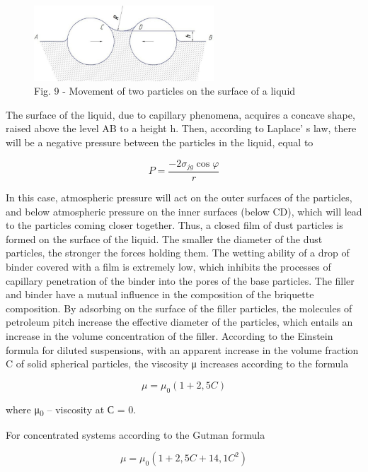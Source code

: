 \begin{figure}[H]
	\centering
	\includegraphics[width=0.6\textwidth]{media/gorn2/image12}
	\caption*{Fig. 9 - Movement of two particles on the surface of a liquid}
\end{figure}

\begin{multicols}{2}
The surface of the liquid, due to capillary phenomena, acquires a
concave shape, raised above the level AB to a height h. Then, according
to Laplace' s law, there will be a negative pressure
between the particles in the liquid, equal to

\begin{equation*}
    P = \frac{-2\sigma_{jg} \cos\varphi}{r}
\end{equation*}

In this case, atmospheric pressure will act on the outer surfaces of the
particles, and below atmospheric pressure on the inner surfaces (below
CD), which will lead to the particles coming closer together. Thus, a
closed film of dust particles is formed on the surface of the liquid.
The smaller the diameter of the dust particles, the stronger the forces
holding them. The wetting ability of a drop of binder covered with a
film is extremely low, which inhibits the processes of capillary
penetration of the binder into the pores of the base particles. The
filler and binder have a mutual influence in the composition of the
briquette composition. By adsorbing on the surface of the filler
particles, the molecules of petroleum pitch increase the effective
diameter of the particles, which entails an increase in the volume
concentration of the filler. According to the Einstein formula for
diluted suspensions, with an apparent increase in the volume fraction C
of solid spherical particles, the viscosity μ increases according to the
formula

\[\mu = \mu_{0}(1 + 2,5C)\]

where μ\textsubscript{0} -- viscosity at С = 0.

For concentrated systems according to the Gutman formula

\[\mu = \mu_{0}(1 + 2,5C + {14,1C}^{2})\]


\end{multicols}
